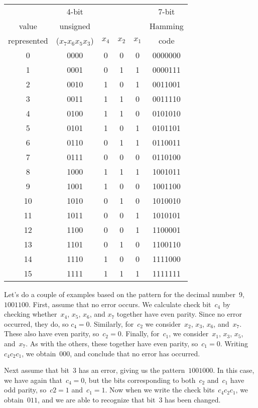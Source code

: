\begin{minipage}{3.4in}
\begin{tabular}{c|c|c|c|c|c}
           &  4-bit         &     &     &     &7-bit\\
value      & unsigned       &     &     &     &Hamming\\
represented&($x_7x_6x_5x_3$)&$x_4$&$x_2$&$x_1$&code\\ \hline
 0& 0000& 0& 0& 0& 0000000\\
 1& 0001& 0& 1& 1& 0000111\\
 2& 0010& 1& 0& 1& 0011001\\
 3& 0011& 1& 1& 0& 0011110\\
 4& 0100& 1& 1& 0& 0101010\\
 5& 0101& 1& 0& 1& 0101101\\
 6& 0110& 0& 1& 1& 0110011\\
 7& 0111& 0& 0& 0& 0110100\\
 8& 1000& 1& 1& 1& 1001011\\
 9& 1001& 1& 0& 0& 1001100\\
10& 1010& 0& 1& 0& 1010010\\
11& 1011& 0& 0& 1& 1010101\\
12& 1100& 0& 0& 1& 1100001\\
13& 1101& 0& 1& 0& 1100110\\
14& 1110& 1& 0& 0& 1111000\\
15& 1111& 1& 1& 1& 1111111\\
\end{tabular}
\end{minipage}

Let's do a couple of examples based on the pattern for the decimal
number~9, $1001100$.  First, assume that no error occurs.  We calculate
check bit~$c_4$ by checking whether~$x_4$, $x_5$, $x_6$, and $x_7$ together
have even parity.  Since no error occurred, they do, so $c_4=0$.
Similarly, for~$c_2$ we consider~$x_2$, $x_3$, $x_6$, and~$x_7$.
These also have even parity, so~$c_2=0$.  Finally, for~$c_1$, we 
consider~$x_1$, $x_3$, $x_5$, and~$x_7$.  As with the others, these
together have even parity, so~$c_1=0$.  Writing~$c_4c_2c_1$, we obtain~$000$,
and conclude that no error has occurred.

Next assume that bit~3 has an error, giving us the pattern~$1001000$.
In this case, we have again that~$c_4=0$, but the bits corresponding to
both~$c_2$ and~$c_1$ have odd parity, so~$c2=1$ and~$c_1=1$.  Now when
we write the check bits~$c_4c_2c_1$, we obtain~$011$,
and we are able to recognize that bit~3 has been changed.

